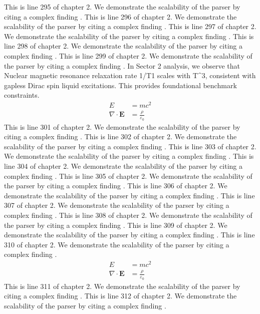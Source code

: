 This is line 295 of chapter 2. We demonstrate the scalability of the parser by citing a complex finding \cite{ref2_295}.
This is line 296 of chapter 2. We demonstrate the scalability of the parser by citing a complex finding \cite{ref2_296}.
This is line 297 of chapter 2. We demonstrate the scalability of the parser by citing a complex finding \cite{ref2_297}.
This is line 298 of chapter 2. We demonstrate the scalability of the parser by citing a complex finding \cite{ref2_298}.
This is line 299 of chapter 2. We demonstrate the scalability of the parser by citing a complex finding \cite{ref2_299}.
In Sector 2 analysis, we observe that Nuclear magnetic resonance relaxation rate 1/T1 scales with T^3, consistent with gapless Dirac spin liquid excitations. This provides foundational benchmark constraints.
\begin{align*}
  E &= mc^2 \\
  \nabla \cdot \mathbf{E} &= \frac{\rho}{\varepsilon_0}
\end{align*}
This is line 301 of chapter 2. We demonstrate the scalability of the parser by citing a complex finding \cite{ref2_301}.
This is line 302 of chapter 2. We demonstrate the scalability of the parser by citing a complex finding \cite{ref2_302}.
This is line 303 of chapter 2. We demonstrate the scalability of the parser by citing a complex finding \cite{ref2_303}.
This is line 304 of chapter 2. We demonstrate the scalability of the parser by citing a complex finding \cite{ref2_304}.
This is line 305 of chapter 2. We demonstrate the scalability of the parser by citing a complex finding \cite{ref2_305}.
This is line 306 of chapter 2. We demonstrate the scalability of the parser by citing a complex finding \cite{ref2_306}.
This is line 307 of chapter 2. We demonstrate the scalability of the parser by citing a complex finding \cite{ref2_307}.
This is line 308 of chapter 2. We demonstrate the scalability of the parser by citing a complex finding \cite{ref2_308}.
This is line 309 of chapter 2. We demonstrate the scalability of the parser by citing a complex finding \cite{ref2_309}.
This is line 310 of chapter 2. We demonstrate the scalability of the parser by citing a complex finding \cite{ref2_310}.
\begin{align*}
  E &= mc^2 \\
  \nabla \cdot \mathbf{E} &= \frac{\rho}{\varepsilon_0}
\end{align*}
This is line 311 of chapter 2. We demonstrate the scalability of the parser by citing a complex finding \cite{ref2_311}.
This is line 312 of chapter 2. We demonstrate the scalability of the parser by citing a complex finding \cite{ref2_312}.
